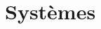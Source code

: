 \documentclass[11pt,fleqn]{book}
\begin{document}
%


\usechapterimagefalse 
\pagestyle{fancy} %


\def\question#1{\paragraph{#1}}
\def\refWeb#1#2{\qrcode[version=1,height=1cm]{#2} \href{#2}{#1} 
}




\chapter{Systèmes}



\end{document}
